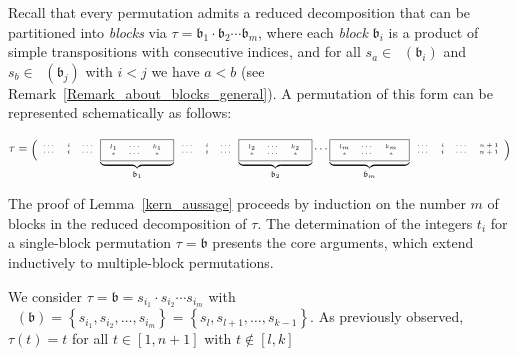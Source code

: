 \documentclass[a4 paper,12pt]{article}
\newcommand{\ger}[1]{\mathfrak{#1}}
\DeclareMathOperator{\Red}{R_{\textbf{d}}}
\begin{document}
  Recall that 
every permutation 
 admits   a reduced decomposition that can be partitioned into \textit{blocks} via $\tau = \ger{b}_1 \cdot \ger{b}_2 \cdots \ger{b}_m$, where each \textit{block} $\ger{b}_i$ is a product of simple transpositions with consecutive indices, and for all $s_a\in \Red(\ger{b}_i)$ and $s_b\in \Red(\ger{b}_j)$ with $i<j$ we have $a<b$ (see Remark~\ref{Remark_about_blocks_general}). A permutation of this form can be represented schematically as follows:
\begin{center}
$\tau =  \begin{tiny}\Bigg(
\begin{array}{ccc}
	\cdots &  i & \cdots\\
	\cdots &  i & \cdots
\end{array}\underbrace{\framebox{$
\begin{array}{ccc}
	l_{1} & \cdots & k_{1} \\
	\ast & \cdots   & \ast 
\end{array}$
}}_{\ger{b}_1}
\begin{array}{ccc}
	\cdots &  i & \cdots\\
	\cdots &  i & \cdots
\end{array}\underbrace{\framebox{$
\begin{array}{ccc}
	l_{2} & \cdots & k_{2} \\
	\ast & \cdots   & \ast 
\end{array}$
}}_{\ger{b}_2} \cdots  \underbrace{\framebox{$
\begin{array}{ccc}
	l_{m} & \cdots & k_{m} \\
	\ast & \cdots   & \ast 
\end{array}$
}}_{\ger{b}_m}
\begin{array}{cccc}
	\cdots &  i & \cdots &n+1\\
	\cdots &  i & \cdots & n+1
\end{array}
\Bigg)\end{tiny} $
\end{center}

The proof of Lemma~\ref{kern_aussage} proceeds by induction on the number $m$ of blocks in the 
reduced decomposition of $\tau$. The determination of the integers $t_i$ for a single-block permutation $\tau = \ger{b}$  presents the core arguments, which extend inductively to multiple-block permutations.


 We consider $\tau = \ger{b} = s_{i_1}\cdot s_{i_2} \cdots s_{i_m}$ with $\Red(\ger{b}) =\left\{s_{i_1}, s_{i_2} ,\ldots, s_{i_m}\right\}  = \left\{s_{l}, s_{l+1} ,\ldots , s_{k-1}\right\}$. As previously observed,  $\tau(t)=t$ for all $t\in \left[1,n+1\right]$ with $t\not\in\left[l,k\right]$
\end{document}
